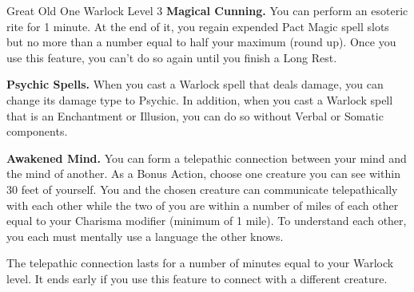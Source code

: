 \begin{Card}[Class]{Great Old One Warlock Level 3}
\textbf{Magical Cunning.} You can perform an esoteric rite for 1 minute. At the end of it, you regain expended Pact Magic spell slots but no more than a number equal to half your maximum (round up). Once you use this feature, you can't do so again until you finish a Long Rest.

\textbf{Psychic Spells.} When you cast a Warlock spell that deals damage, you can change its damage type to Psychic. In addition, when you cast a Warlock spell that is an Enchantment or Illusion, you can do so without Verbal or Somatic components.

\textbf{Awakened Mind.} You can form a telepathic connection between your mind and the mind of another. As a Bonus Action, choose one creature you can see within 30 feet of yourself. You and the chosen creature can communicate telepathically with each other while the two of you are within a number of miles of each other equal to your Charisma modifier (minimum of 1 mile). To understand each other, you each must mentally use a language the other knows.

The telepathic connection lasts for a number of minutes equal to your Warlock level. It ends early if you use this feature to connect with a different creature.
\end{Card}


